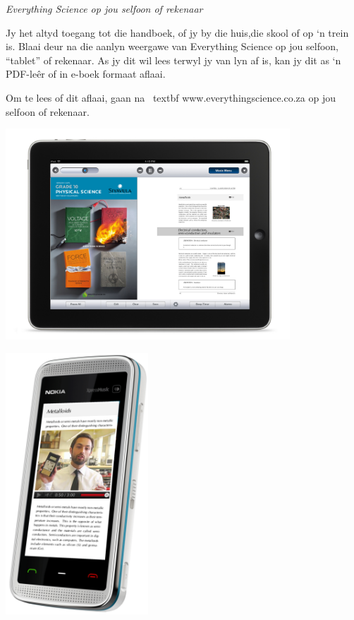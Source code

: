 \newpage
\thispagestyle{empty}

{\normalfont\sffamily\fontsize{22}\normalfont\itshape Everything Science op jou selfoon of rekenaar} \par

{\normalsize
Jy het altyd toegang  tot die handboek, of jy by die huis,die skool of op ‘n trein is. Blaai deur na die aanlyn weergawe van Everything Science op jou selfoon, “tablet” of rekenaar. As jy dit wil lees terwyl jy van lyn af is, kan jy dit as ‘n PDF-leêr of in e-boek formaat aflaai.\par


Om te lees of dit aflaai, gaan na \ textbf {www.everythingscience.co.za} op jou selfoon of rekenaar.} \vspace*{2cm}


\begin{center}
\begin{minipage}{0.4\textwidth}
\centering
\includegraphics[width=0.8\textwidth]{title_images/ipad.jpg}
\end{minipage}
\begin{minipage}{0.4\textwidth}
\centering
\includegraphics[width=0.4\textwidth]{title_images/phone.png}
\end{minipage}
\end{center}

